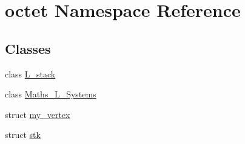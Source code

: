 \hypertarget{namespaceoctet}{\section{octet Namespace Reference}
\label{namespaceoctet}
}
\subsection*{Classes}
\begin{DoxyCompactItemize}
\item 
class \hyperlink{classoctet_1_1_l__stack}{L\+\_\+stack}
\item 
class \hyperlink{classoctet_1_1_maths___l___systems}{Maths\+\_\+\+L\+\_\+\+Systems}
\item 
struct \hyperlink{structoctet_1_1my__vertex}{my\+\_\+vertex}
\item 
struct \hyperlink{structoctet_1_1stk}{stk}
\end{DoxyCompactItemize}
